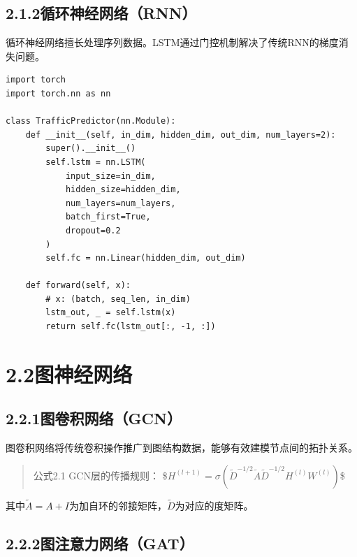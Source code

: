 \documentclass{harryopo-report}
\begin{document}
\subsection*{2.1.2循环神经网络（RNN）}

循环神经网络擅长处理序列数据。LSTM通过门控机制解决了传统RNN的梯度消失问题。

\begin{lstlisting}[style=pystyle,caption={}]
import torch
import torch.nn as nn

class TrafficPredictor(nn.Module):
    def __init__(self, in_dim, hidden_dim, out_dim, num_layers=2):
        super().__init__()
        self.lstm = nn.LSTM(
            input_size=in_dim,
            hidden_size=hidden_dim,
            num_layers=num_layers,
            batch_first=True,
            dropout=0.2
        )
        self.fc = nn.Linear(hidden_dim, out_dim)

    def forward(self, x):
        # x: (batch, seq_len, in_dim)
        lstm_out, _ = self.lstm(x)
        return self.fc(lstm_out[:, -1, :])
\end{lstlisting}

\section*{2.2图神经网络}

\subsection*{2.2.1图卷积网络（GCN）}

图卷积网络将传统卷积操作推广到图结构数据，能够有效建模节点间的拓扑关系。

\begin{quote}
{\fzht 公式2.1} GCN层的传播规则：
\$$H^{(l+1)} = \sigma\left(\tilde{D}^{-1/2} \tilde{A} \tilde{D}^{-1/2} H^{(l)} W^{(l)}\right)$\$
\end{quote}

其中$\tilde{A} = A + I$为加自环的邻接矩阵，$\tilde{D}$为对应的度矩阵。

\subsection*{2.2.2图注意力网络（GAT）}
\end{document}

